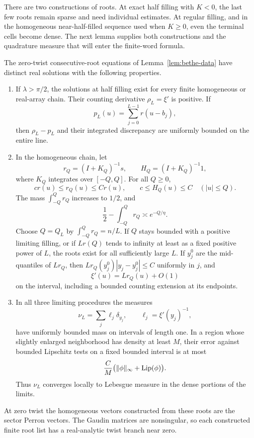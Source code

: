 There are two constructions of roots. At exact half filling with
$K<0$, the last few roots remain sparse and need individual estimates.
At regular filling, and in the homogeneous near-half-filled sequence
used when $K\ge0$, even the terminal cells become dense. The next
lemma supplies both constructions and the quadrature measure that
will enter the finite-word formula.

\begin{lemma}\label{lem:root-limits}
The zero-twist consecutive-root equations of
Lemma~\ref{lem:bethe-data} have distinct real solutions with the
following properties.
\begin{enumerate}
\item If $\lambda>\pi/2$, the solutions at half filling exist for
 every finite homogeneous or real-array chain.  Their counting
 derivative $\rho_L=\xi'$ is positive.  If
 \[
 p_L(u)=\sum_{j=0}^{L-1}r(u-b_j),
 \]
 then $\rho_L-p_L$ and their integrated discrepancy are uniformly
 bounded on the entire line.
\item In the homogeneous chain, let
 \[
 r_Q=(I+K_Q)^{-1}s,\qquad H_Q=(I+K_Q)^{-1}1,
 \]
 where $K_Q$ integrates over $[-Q,Q]$.  For all $Q\ge0$,
 \begin{equation}\label{eq:regular-density-comparison}
 c r(u)\le r_Q(u)\le C r(u),\qquad
 c\le H_Q(u)\le C\quad (|u|\le Q).
 \end{equation}
 The mass $\int_{-Q}^Q r_Q$ increases to $1/2$, and
 \[
 \frac12-\int_{-Q}^Q r_Q\asymp e^{-Q/\eta}.
 \]
 Choose $Q=Q_L$ by $\int_{-Q}^Q r_Q=n/L$.
 If $Q$ stays bounded with a positive limiting filling, or if
 $Lr(Q)$ tends to infinity at least as a fixed positive power of
 $L$, the roots exist for all sufficiently large $L$.  If $y_j^0$ are the mid-quantiles of $Lr_Q$, then
 $Lr_Q(y_j^0)|y_j-y_j^0|\le C$ uniformly in $j$, and
 \begin{equation}\label{eq:regular-counting-density}
 \xi'(u)=Lr_Q(u)+O(1)
 \end{equation}
 on the interval, including a bounded counting extension at its
 endpoints.
\item In all three limiting procedures the measures
 \[
 \nu_L=\sum_j\ell_j\delta_{y_j},\qquad
 \ell_j=\xi'(y_j)^{-1},
 \]
 have uniformly bounded mass on intervals of length one.  In a
 region whose slightly enlarged neighborhood has density at least
 $M$, their error against bounded Lipschitz tests on a fixed
 bounded interval is at most
 \begin{equation}\label{eq:local-quadrature}
 \frac{C}{M}\bigl(\|\phi\|_\infty+\operatorname{Lip}(\phi)\bigr).
 \end{equation}
 Thus $\nu_L$ converges locally to Lebesgue measure in the dense
 portions of the limits.
\end{enumerate}
At zero twist the homogeneous vectors constructed from these roots
are the sector Perron vectors.  The Gaudin matrices are nonsingular,
so each constructed finite root list has a real-analytic twist branch
near zero.
\end{lemma}

